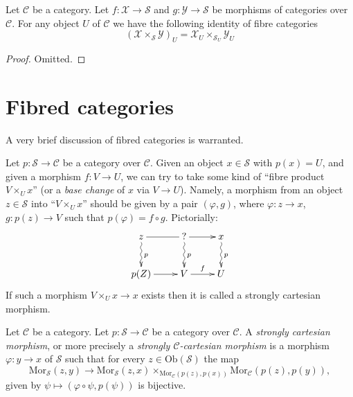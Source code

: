 \begin{lemma}
\label{lemma-fibre-2-fibre-product-categories-over-C}
Let $\mathcal{C}$ be a category.
Let $f : \mathcal{X} \to \mathcal{S}$ and
$g : \mathcal{Y} \to \mathcal{S}$ be morphisms of categories over
$\mathcal{C}$. For any object $U$ of $\mathcal{C}$ we have
the following identity of
fibre categories
$$
\left(\mathcal{X} \times_\mathcal{S}\mathcal{Y}\right)_U
=
\mathcal{X}_U \times_{\mathcal{S}_U} \mathcal{Y}_U
$$
\end{lemma}

\begin{proof}
Omitted.
\end{proof}







\section{Fibred categories}
\label{section-fibred-categories}

\noindent
A very brief discussion of fibred categories is warranted.

\medskip\noindent
Let $p : \mathcal{S} \to \mathcal{C}$ be a category over $\mathcal{C}$.
Given an object $x \in \mathcal{S}$ with $p(x) = U$, and given a morphism
$f : V \to U$, we can try to take some kind of ``fibre product
$V \times_U x$'' (or a {\it base change} of $x$ via $V \to U$).
Namely, a morphism from an object $z \in \mathcal{S}$
into ``$V \times_U x$'' should be given by a pair
$(\varphi, g)$, where
$\varphi : z \to x$, $g : p(z) \to V$ such that
$p(\varphi) = f \circ g$. Pictorially:
$$
\xymatrix{
z \ar@{~>}[d]^p \ar@{-}[r] &
? \ar[r] \ar@{~>}[d]^p &
x \ar@{~>}[d]^p \\
p(Z) \ar[r] & V \ar[r]^f & U
}
$$
If such a morphism $V \times_U x \to x$ exists then it is called
a strongly cartesian morphism.

\begin{definition}
\label{definition-cartesian-over-C}
Let $\mathcal{C}$ be a category.
Let $p : \mathcal{S} \to \mathcal{C}$ be a category over $\mathcal{C}$.
A {\it strongly cartesian morphism}, or more precisely a
{\it strongly $\mathcal{C}$-cartesian morphism} is a
morphism $\varphi : y \to x$ of $\mathcal{S}$ such that
for every $z \in \text{Ob}(\mathcal{S})$ the map
$$
\text{Mor}_{\mathcal{S}}(z, y)
\longrightarrow
\text{Mor}_{\mathcal{S}}(z, x)
\times_{\text{Mor}_{\mathcal{C}}(p(z), p(x))}
\text{Mor}_{\mathcal{C}}(p(z), p(y)),
$$
given by $\psi \longmapsto (\varphi \circ \psi, p(\psi))$
is bijective.
\end{definition}


